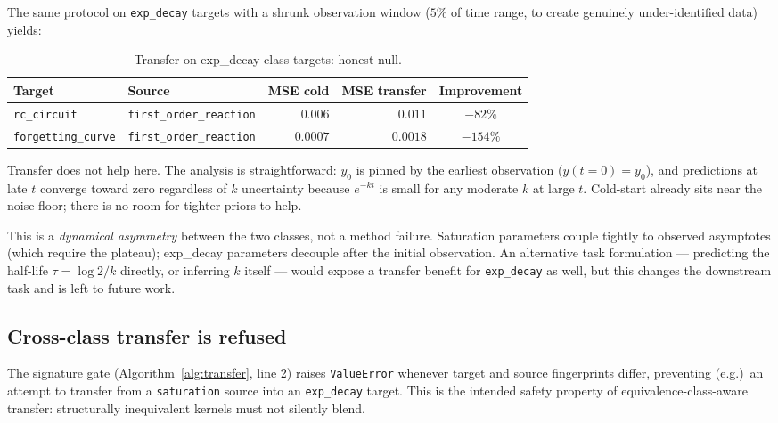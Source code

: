 \documentclass{article}
\begin{document}
The same protocol on \texttt{exp\_decay} targets with a shrunk
observation window ($5\%$ of time range, to create genuinely
under-identified data) yields:

\begin{table}[h]
\centering
\caption{Transfer on exp\_decay-class targets: honest null.}
\label{tab:transfer-expdecay}
\begin{tabular}{llrrc}
\toprule
Target                     & Source                           & MSE cold & MSE transfer & Improvement \\
\midrule
\texttt{rc\_circuit}       & \texttt{first\_order\_reaction} & $0.006$   & $0.011$      & $-82\%$ \\
\texttt{forgetting\_curve} & \texttt{first\_order\_reaction} & $0.0007$  & $0.0018$     & $-154\%$ \\
\bottomrule
\end{tabular}
\end{table}

\noindent Transfer does not help here. The analysis is straightforward:
$y_{0}$ is pinned by the earliest observation ($y(t=0) = y_{0}$), and
predictions at late $t$ converge toward zero regardless of $k$
uncertainty because $e^{-kt}$ is small for any moderate $k$ at large
$t$. Cold-start already sits near the noise floor; there is no room
for tighter priors to help.

This is a \emph{dynamical asymmetry} between the two classes, not a
method failure. Saturation parameters couple tightly to observed
asymptotes (which require the plateau); exp\_decay parameters
decouple after the initial observation. An alternative task
formulation --- predicting the half-life $\tau = \log 2 / k$ directly,
or inferring $k$ itself --- would expose a transfer benefit for
\texttt{exp\_decay} as well, but this changes the downstream task and
is left to future work.

\subsection{Cross-class transfer is refused}
\label{sec:gate}

The signature gate (Algorithm~\ref{alg:transfer}, line 2) raises
\texttt{ValueError} whenever target and source fingerprints differ,
preventing (e.g.)\ an attempt to transfer from a \texttt{saturation}
source into an \texttt{exp\_decay} target. This is the intended safety
property of equivalence-class-aware transfer: structurally inequivalent
kernels must not silently blend.
\end{document}
